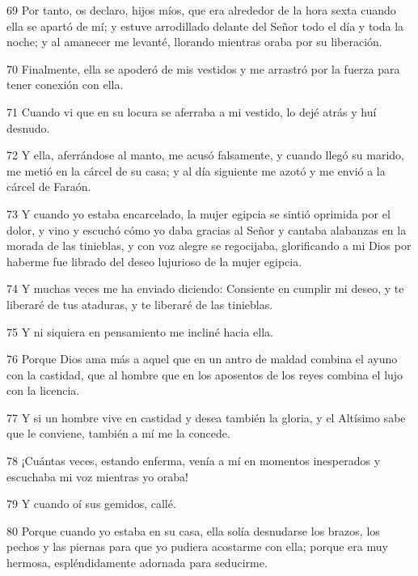 \par 69 Por tanto, os declaro, hijos míos, que era alrededor de la hora sexta cuando ella se apartó de mí; y estuve arrodillado delante del Señor todo el día y toda la noche; y al amanecer me levanté, llorando mientras oraba por su liberación.

\par 70 Finalmente, ella se apoderó de mis vestidos y me arrastró por la fuerza para tener conexión con ella.

\par 71 Cuando vi que en su locura se aferraba a mi vestido, lo dejé atrás y huí desnudo.

\par 72 Y ella, aferrándose al manto, me acusó falsamente, y cuando llegó su marido, me metió en la cárcel de su casa; y al día siguiente me azotó y me envió a la cárcel de Faraón.

\par 73 Y cuando yo estaba encarcelado, la mujer egipcia se sintió oprimida por el dolor, y vino y escuchó cómo yo daba gracias al Señor y cantaba alabanzas en la morada de las tinieblas, y con voz alegre se regocijaba, glorificando a mi Dios por haberme fue librado del deseo lujurioso de la mujer egipcia.

\par 74 Y muchas veces me ha enviado diciendo: Consiente en cumplir mi deseo, y te liberaré de tus ataduras, y te liberaré de las tinieblas.

\par 75 Y ni siquiera en pensamiento me incliné hacia ella.

\par 76 Porque Dios ama más a aquel que en un antro de maldad combina el ayuno con la castidad, que al hombre que en los aposentos de los reyes combina el lujo con la licencia.

\par 77 Y si un hombre vive en castidad y desea también la gloria, y el Altísimo sabe que le conviene, también a mí me la concede.

\par 78 ¡Cuántas veces, estando enferma, venía a mí en momentos inesperados y escuchaba mi voz mientras yo oraba!

\par 79 Y cuando oí sus gemidos, callé.

\par 80 Porque cuando yo estaba en su casa, ella solía desnudarse los brazos, los pechos y las piernas para que yo pudiera acostarme con ella; porque era muy hermosa, espléndidamente adornada para seducirme.

